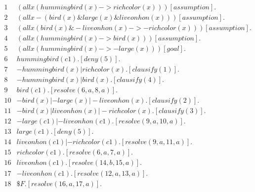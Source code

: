 \documentclass[letterpaper, 12pt]{artikel3}
\begin{document}

\begin{align*}
1& (all x (hummingbird(x) -> richcolor(x)))   [assumption]. \\
2& (all x -(bird(x) \& large(x) \& liveonhon(x)))  [assumption].\\
3& (all x (bird(x) \& -liveonhon(x) -> -richcolor(x)))  [assumption].\\
4& (all x (hummingbird(x) -> bird(x)))   [assumption].\\
5& (all x (hummingbird(x) -> -large(x)))   [goal].\\
6& hummingbird(c1).  [deny(5)].\\
7& -hummingbird(x) | richcolor(x).  [clausify(1)].\\
8& -hummingbird(x) | bird(x).  [clausify(4)].\\
9& bird(c1).  [resolve(6,a,8,a)].\\
10& -bird(x) | -large(x) | -liveonhon(x).  [clausify(2)].\\
11& -bird(x) | liveonhon(x) | -richcolor(x).  [clausify(3)].\\
12& -large(c1) | -liveonhon(c1).  [resolve(9,a,10,a)].\\
13& large(c1).  [deny(5)].\\
14& liveonhon(c1) | -richcolor(c1).  [resolve(9,a,11,a)].\\
15& richcolor(c1).  [resolve(6,a,7,a)].\\
16& liveonhon(c1).  [resolve(14,b,15,a)].\\
17& -liveonhon(c1).  [resolve(12,a,13,a)].\\
18& \$F.  [resolve(16,a,17,a)].
\end{align*}
\end{document}
